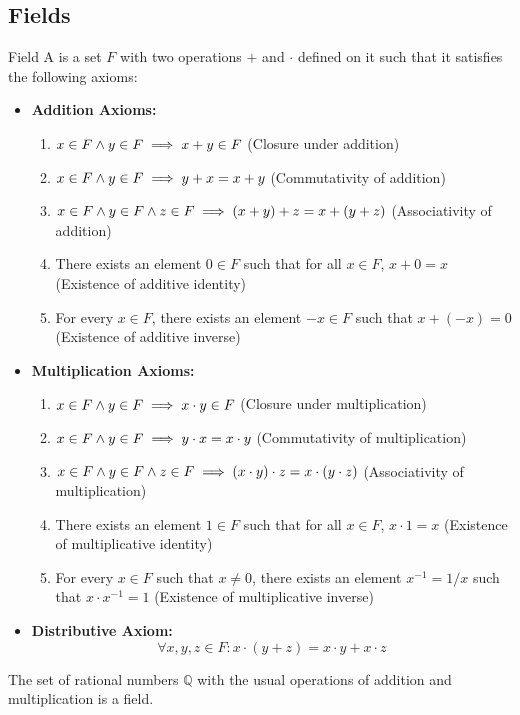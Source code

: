 \documentclass[openany]{book}
\begin{document}
\subsection{Fields}
\begin{mydefinition}{Field}
    A  is a set $F$ with two operations $+$ and $\cdot$ defined on it such that it satisfies the following axioms: 
    \begin{itemize}
    \item \textbf{Addition Axioms:}
        \begin{enumerate}
            \item $x \in F \wedge y \in F \implies x + y \in F$ (Closure under addition)
            \item $x \in F \wedge y \in F \implies y + x = x + y$ (Commutativity of addition)
            \item $x \in F \wedge y \in F \wedge z \in F \implies (x + y) + z = x + (y + z)$ (Associativity of addition)
            \item There exists an element $0 \in F$ such that for all $x \in F$, $x + 0 = x$ (Existence of additive identity)
            \item For every $x \in F$, there exists an element $-x \in F$ such that $x + (-x) = 0$ (Existence of additive inverse)
        \end{enumerate}
    \item \textbf{Multiplication Axioms:}
        \begin{enumerate}
            \item $x \in F \wedge y \in F \implies x \cdot y \in F$ (Closure under multiplication)
            \item $x \in F \wedge y \in F \implies y \cdot x = x \cdot y$ (Commutativity of multiplication)
            \item $x \in F \wedge y \in F \wedge z \in F \implies (x \cdot y) \cdot z = x \cdot (y \cdot z)$ (Associativity of multiplication)
            \item There exists an element $1 \in F$ such that for all $x \in F$, $x \cdot 1 = x$ (Existence of multiplicative identity)
            \item For every $x \in F$ such that $x \neq 0$, there exists an element $x^{-1} = 1/x$ such that $x \cdot x^{-1} = 1$ (Existence of multiplicative inverse)
        \end{enumerate}
    \item \textbf{Distributive Axiom:} $$\forall x, y, z \in F: x \cdot (y + z) = x \cdot y + x \cdot z$$   
    \end{itemize}
    \begin{example}
        The set of rational numbers $\mathbb{Q}$ with the usual operations of addition and multiplication is a field.
    \end{example}
\end{mydefinition}
\end{document}
